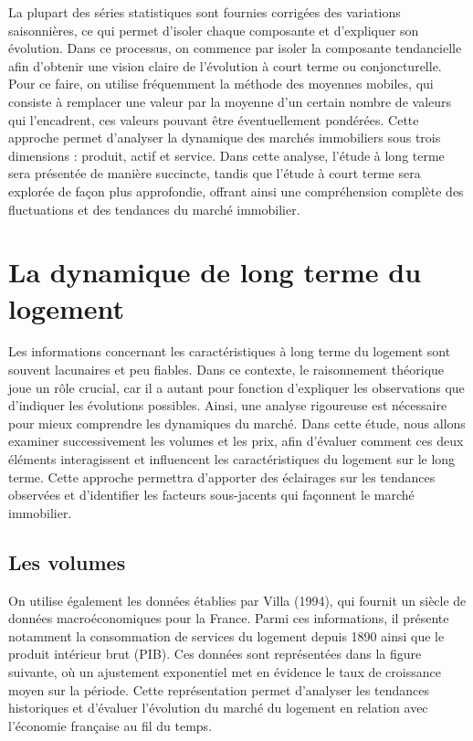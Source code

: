 \documentclass[a4paper, 12pt]{report}
\begin{document}
La plupart des séries statistiques sont fournies corrigées des variations saisonnières, ce qui permet d'isoler chaque composante et d'expliquer son évolution. Dans ce processus, on commence par isoler la composante tendancielle afin d'obtenir une vision claire de l'évolution à court terme ou conjoncturelle. Pour ce faire, on utilise fréquemment la méthode des moyennes mobiles, qui consiste à remplacer une valeur par la moyenne d'un certain nombre de valeurs qui l'encadrent, ces valeurs pouvant être éventuellement pondérées. Cette approche permet d'analyser la dynamique des marchés immobiliers sous trois dimensions : produit, actif et service. Dans cette analyse, l'étude à long terme sera présentée de manière succincte, tandis que l'étude à court terme sera explorée de façon plus approfondie, offrant ainsi une compréhension complète des fluctuations et des tendances du marché immobilier.

\section{La dynamique de long terme du logement}

Les informations concernant les caractéristiques à long terme du logement sont souvent lacunaires et peu fiables. Dans ce contexte, le raisonnement théorique joue un rôle crucial, car il a autant pour fonction d'expliquer les observations que d'indiquer les évolutions possibles. Ainsi, une analyse rigoureuse est nécessaire pour mieux comprendre les dynamiques du marché. Dans cette étude, nous allons examiner successivement les volumes et les prix, afin d'évaluer comment ces deux éléments interagissent et influencent les caractéristiques du logement sur le long terme. Cette approche permettra d'apporter des éclairages sur les tendances observées et d'identifier les facteurs sous-jacents qui façonnent le marché immobilier.

\subsection{Les volumes}

On utilise également les données établies par Villa (1994), qui fournit un siècle de données macroéconomiques pour la France. Parmi ces informations, il présente notamment la consommation de services du logement depuis 1890 ainsi que le produit intérieur brut (PIB). Ces données sont représentées dans la figure suivante, où un ajustement exponentiel met en évidence le taux de croissance moyen sur la période. Cette représentation permet d'analyser les tendances historiques et d'évaluer l'évolution du marché du logement en relation avec l'économie française au fil du temps.
\end{document}
